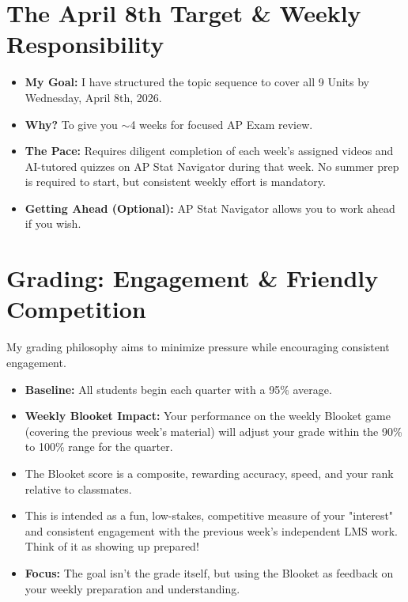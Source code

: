 \documentclass[11pt]{article}
\begin{document}
\section{The April 8th Target \& Weekly Responsibility}

\begin{itemize}[leftmargin=*]
  \item \textbf{My Goal:} I have structured the topic sequence to cover all 9 Units by Wednesday, April 8th, 2026.
  
  \item \textbf{Why?} To give you $\sim$4 weeks for focused AP Exam review.
  
  \item \textbf{The Pace:} Requires diligent completion of each week's assigned videos and AI-tutored quizzes on AP Stat Navigator during that week. No summer prep is required to start, but consistent weekly effort is mandatory.
  
  \item \textbf{Getting Ahead (Optional):} AP Stat Navigator allows you to work ahead if you wish.
\end{itemize}

\section{Grading: Engagement \& Friendly Competition}

My grading philosophy aims to minimize pressure while encouraging consistent engagement.

\begin{itemize}[leftmargin=*]
  \item \textbf{Baseline:} All students begin each quarter with a 95\% average.
  
  \item \textbf{Weekly Blooket Impact:} Your performance on the weekly Blooket game (covering the previous week's material) will adjust your grade within the 90\% to 100\% range for the quarter.
  
  \item The Blooket score is a composite, rewarding accuracy, speed, and your rank relative to classmates.
  
  \item This is intended as a fun, low-stakes, competitive measure of your "interest" and consistent engagement with the previous week's independent LMS work. Think of it as showing up prepared!
  
  \item \textbf{Focus:} The goal isn't the grade itself, but using the Blooket as feedback on your weekly preparation and understanding.
\end{itemize}
\end{document}
